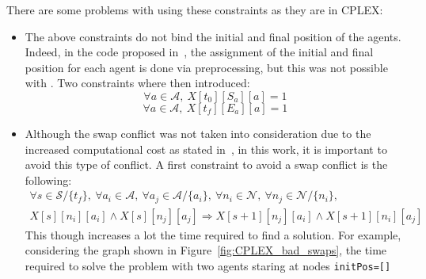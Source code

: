 There are some problems with using these constraints as they are in CPLEX:
\begin{itemize}
  \item The above constraints do not bind the initial and final position of the
    agents. Indeed, in the code proposed in~\cite{picat1}, the assignment of
    the initial and final position for each agent is done via preprocessing,
    but this was not possible with \OPL. Two constraints where then introduced:
    \begin{equation}
      \forall a \in \mathcal{A},~X[t_0][S_a][a] = 1
      \label{eq:cplex_init_pos}
    \end{equation}
    \begin{equation}
      \forall a \in \mathcal{A},~X[t_f][E_a][a] = 1
      \label{eq:cplex_final_pos}
    \end{equation}
  \item Although the swap conflict was not taken into consideration due to the
    increased computational cost as stated in~\cite{picat1}, in this work, it 
    is important to avoid this type of conflict. A first constraint to avoid a
    swap conflict is the following:
    \begin{equation}
      \begin{split}
      \forall s \in\mathcal{S}/\{t_f\},~\forall a_i \in\mathcal{A},~\forall 
      a_j\in \mathcal{A}/\{a_i\},~\forall n_i \in \mathcal{N},~\forall n_j \in 
      \mathcal{N}/\{n_i\},\\
      X[s][n_i][a_i] \wedge X[s][n_j][a_j] \Rightarrow
      X[s+1][n_j][a_i]\wedge X[s+1][n_i][a_j]
      \end{split}
      \label{eq:cplex_no_swaps}
    \end{equation}
    This though increases a lot the time required to find a solution. For
    example, considering the graph shown in Figure~\ref{fig:CPLEX_bad_swaps},
    the time required to solve the \MAPF problem with two agents staring at
    nodes \texttt{initPos=[]}  
    
\end{itemize}
